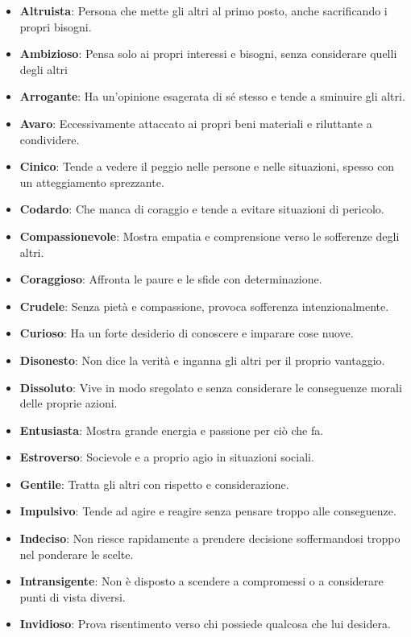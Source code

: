 \begin{multicols}{2}
\noindent\begin{itemize}[leftmargin=*] \setlength{\itemsep}{0pt}
	\item \textbf{Altruista}: Persona che mette gli altri al primo posto, anche sacrificando i propri bisogni.
	\item \textbf{Ambizioso}: Pensa solo ai propri interessi e bisogni, senza considerare quelli degli altri
	\item \textbf{Arrogante}: Ha un'opinione esagerata di sé stesso e tende a sminuire gli altri.
	\item \textbf{Avaro}: Eccessivamente attaccato ai propri beni materiali e riluttante a condividere.
	\item \textbf{Cinico}: Tende a vedere il peggio nelle persone e nelle situazioni, spesso con un atteggiamento sprezzante.
	\item \textbf{Codardo}: Che manca di coraggio e tende a evitare situazioni di pericolo.
	\item \textbf{Compassionevole}: Mostra empatia e comprensione verso le sofferenze degli altri.
	\item \textbf{Coraggioso}: Affronta le paure e le sfide con determinazione.
	\item \textbf{Crudele}: Senza pietà e compassione, provoca sofferenza intenzionalmente.
	\item \textbf{Curioso}: Ha un forte desiderio di conoscere e imparare cose nuove.
	\item \textbf{Disonesto}: Non dice la verità e inganna gli altri per il proprio vantaggio.
	\item \textbf{Dissoluto}: Vive in modo sregolato e senza considerare le conseguenze morali delle proprie azioni.
	\item \textbf{Entusiasta}: Mostra grande energia e passione per ciò che fa.
	\item \textbf{Estroverso}: Socievole e a proprio agio in situazioni sociali.
	\item \textbf{Gentile}: Tratta gli altri con rispetto e considerazione.
	\item \textbf{Impulsivo}: Tende ad agire e reagire senza pensare troppo alle conseguenze.
	\item \textbf{Indeciso}: Non riesce rapidamente a prendere decisione soffermandosi troppo nel ponderare le scelte.
	\item \textbf{Intransigente}: Non è disposto a scendere a compromessi o a considerare punti di vista diversi.
	\item \textbf{Invidioso}: Prova risentimento verso chi possiede qualcosa che lui desidera.

\end{itemize}
\end{multicols}
